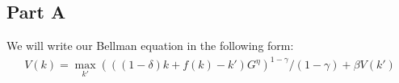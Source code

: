 \documentclass[11pt]{article} %
\begin{document}
\subsection{Part A}
%
%
%
We will write our Bellman equation in the following form:
\begin{align}
V(k) = \max_{k'} (((1-\delta) k + f(k) - k')G^{\eta})^{1-\gamma}/(1-\gamma) + \beta V(k') \label{eqn:bellk}
\end{align}
\end{document}
